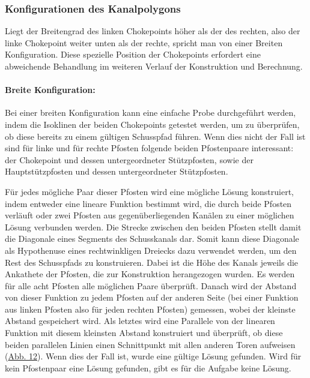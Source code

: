 \newpage
\subsubsection{Konfigurationen des Kanalpolygons} 
\label{sec:ende_3}
Liegt der Breitengrad des linken Chokepoints höher als der des rechten, also der linke Chokepoint weiter unten als der rechte, spricht man von einer Breiten Konfiguration. Diese spezielle Position der Chokepoints erfordert eine abweichende Behandlung im weiteren Verlauf der Konstruktion und Berechnung.

\paragraph{Breite Konfiguration:}

Bei einer breiten Konfiguration kann eine einfache Probe durchgeführt werden, indem die Isoklinen der beiden Chokepoints getestet werden, um zu überprüfen, ob diese bereits zu einem gültigen Schusspfad führen.
Wenn dies nicht der Fall ist sind für linke und für rechte Pfosten folgende beiden Pfostenpaare interessant: der Chokepoint und dessen untergeordneter Stützpfosten, sowie der Hauptstützpfosten und dessen untergeordneter Stützpfosten.

Für jedes mögliche Paar dieser Pfosten wird eine mögliche Lösung konstruiert, indem entweder eine lineare Funktion bestimmt wird, die durch beide Pfosten verläuft oder zwei Pfosten aus gegenüberliegenden Kanälen zu einer möglichen Lösung verbunden werden. Die Strecke zwischen den beiden Pfosten stellt damit die Diagonale eines Segments des Schusskanals dar. Somit kann diese Diagonale als Hypothenuse eines rechtwinkligen Dreiecks dazu verwendet werden, um den Rest des Schusspfads zu konstruieren. Dabei ist die Höhe des Kanals jeweils die Ankathete der Pfosten, die zur Konstruktion herangezogen wurden. Es werden für alle acht Pfosten alle möglichen Paare überprüft. Danach wird der Abstand von dieser Funktion zu jedem Pfosten auf der anderen Seite (bei einer Funktion aus linken Pfosten also für jeden rechten Pfosten) gemessen, wobei der kleinste Abstand gespeichert wird. Als letztes wird eine Parallele von der linearen Funktion mit diesem kleinsten Abstand konstruiert und überprüft, ob diese beiden parallelen Linien einen Schnittpunkt mit allen anderen Toren aufweisen (\hyperref[fig:schusspfad]{Abb. 12}). Wenn dies der Fall ist, wurde eine gültige Lösung gefunden. Wird für kein Pfostenpaar eine Lösung gefunden, gibt es für die Aufgabe keine Lösung.

